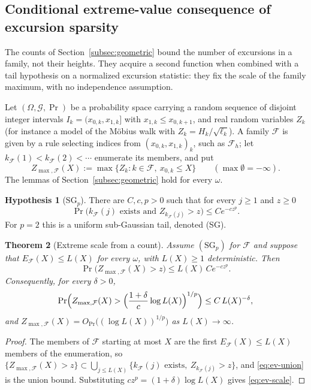 \documentclass[11pt]{amsart}
\numberwithin{equation}{section}
\theoremstyle{plain}
\newtheorem{theorem}{Theorem}[section]
\theoremstyle{definition}
\newtheorem{hypothesis}[theorem]{Hypothesis}
\theoremstyle{remark}
\newcommand{\F}{\mathcal{F}}
\begin{document}
\subsection{Conditional extreme-value consequence of excursion sparsity}
\label{subsec:extreme}

The counts of Section~\ref{subsec:geometric} bound the number of excursions
in a family, not their heights. They acquire a second function when combined
with a tail hypothesis on a normalized excursion statistic: they fix the
scale of the family maximum, with no independence assumption.

Let $(\Omega,\mathcal G,\Pr)$ be a probability space carrying a random
sequence of disjoint integer intervals $I_k=(x_{0,k},x_{1,k}]$ with
$x_{1,k}\le x_{0,k+1}$, and real random variables $Z_k$ (for instance a model
of the M\"obius walk with $Z_k=H_k/\sqrt{\ell_k}$). A family $\F$ is given by
a rule selecting indices from $(x_{0,k},x_{1,k})_k$, such as $\F_h$; let
$k_\F(1)<k_\F(2)<\cdots$ enumerate its members, and put
\[
Z_{\max,\F}(X):=\max\{Z_k:k\in\F,\ x_{0,k}\le X\}\qquad(\max\emptyset=-\infty).
\]
The lemmas of Section~\ref{subsec:geometric} hold for every $\omega$.

\begin{hypothesis}[$\mathrm{SG}_p$]
\label{hyp:SG}
There are $C,c,p>0$ such that for every $j\ge1$ and $z\ge0$
\[
\Pr\bigl(k_\F(j)\text{ exists and }Z_{k_\F(j)}>z\bigr)\le Ce^{-cz^p}.
\]
For $p=2$ this is a uniform sub-Gaussian tail, denoted (SG).
\end{hypothesis}

\begin{theorem}[Extreme scale from a count]
\label{thm:ev-union}
Assume $(\mathrm{SG}_p)$ for $\F$ and suppose that $E_\F(X)\le L(X)$ for
every $\omega$, with $L(X)\ge1$ deterministic. Then
\begin{equation}
\label{eq:ev-union}
\Pr\bigl(Z_{\max,\F}(X)>z\bigr)\le L(X)\,Ce^{-cz^p}.
\end{equation}
Consequently, for every $\delta>0$,
\begin{equation}
\label{eq:ev-scale}
\Pr\Bigl(Z_{\max,\F}(X)>\Bigl(\frac{1+\delta}{c}\log L(X)\Bigr)^{1/p}\Bigr)
\le C\,L(X)^{-\delta},
\end{equation}
and $Z_{\max,\F}(X)=O_{\Pr}\bigl((\log L(X))^{1/p}\bigr)$ as $L(X)\to\infty$.
\end{theorem}

\begin{proof}
The members of $\F$ starting at most $X$ are the first $E_\F(X)\le L(X)$
members of the enumeration, so
$\{Z_{\max,\F}(X)>z\}\subset\bigcup_{j\le L(X)}\{k_\F(j)\text{ exists},\
Z_{k_\F(j)}>z\}$, and \eqref{eq:ev-union} is the union bound. Substituting
$cz^p=(1+\delta)\log L(X)$ gives \eqref{eq:ev-scale}.
\end{proof}
\end{document}
